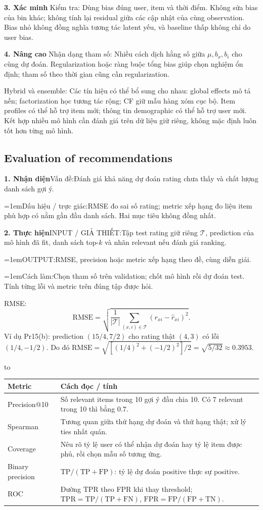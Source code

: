 \documentclass[10pt,a4paper,twocolumn]{article}
\newif\ifexamheadingprinted
\newcommand{\topic}[2]{%
  \global\examheadingprintedfalse\par\subsection{#2}\label{topic:#1}}
\newcommand{\key}[1]{#1:\enspace}
\newenvironment{examtable}[1]{%
  \par\addvspace{2pt}\noindent\hbox to \linewidth\bgroup\hfil
  \setlength{\tabcolsep}{4pt}%
  \renewcommand{\arraystretch}{1.12}\begin{tabular}{#1}%
}{\end{tabular}\hfil\egroup\par\addvspace{2pt}}
\newcommand{\algfield}[2]{\par\noindent\hangindent=1em\relax#1:\enspace#2}
\newcommand{\unitheading}[2]{%
  \par\addvspace{1pt}\noindent\textbf{#1. #2}\enspace}
\newcommand{\unitverification}{\unitheading{3}{Xác minh}}
\newcommand{\unitadvanced}{\unitheading{4}{Nâng cao}}
\newcommand{\unitfield}[4]{%
  \par\noindent\textbf{#1. #2}\enspace #3:\enspace #4}
\newcommand{\algsummary}[6]{%
  \begingroup\setlength{\parskip}{1pt}%
  \unitfield{1}{Nhận diện}{Vấn đề}{#1}%
  \algfield{Dấu hiệu / trực giác}{#2}%
  \if\relax\detokenize{#3}\relax\else\par\noindent#3\par\fi%
  \unitfield{2}{Thực hiện}{INPUT / GIẢ THIẾT}{#4}%
  \algfield{OUTPUT}{#5}%
  \algfield{Cách làm}{#6}\par\endgroup}
\begin{document}
\unitverification
\key{Kiểm tra} Dùng bias đúng user, item và thời điểm. Không sửa bias của bin khác; không tính lại residual giữa các cập nhật của cùng observation. Bias nhỏ không đồng nghĩa tương tác latent yếu, và baseline thấp không chỉ do user bias.

\unitadvanced
\key{Nhận dạng tham số} Nhiều cách dịch hằng số giữa $\mu,b_x,b_i$ cho cùng dự đoán. Regularization hoặc ràng buộc tổng bias giúp chọn nghiệm ổn định; tham số theo thời gian cũng cần regularization.

\key{Hybrid và ensemble} Các tín hiệu có thể bổ sung cho nhau: global effects mô tả nền; factorization học tương tác rộng; CF giữ mẫu hàng xóm cục bộ. Item profiles có thể hỗ trợ item mới; thông tin demographic có thể hỗ trợ user mới. Kết hợp nhiều mô hình cần đánh giá trên dữ liệu giữ riêng, không mặc định luôn tốt hơn từng mô hình.

\topic{recevaluation}{Evaluation of recommendations}

\algsummary{Đánh giá khả năng dự đoán rating chưa thấy và chất lượng danh sách gợi ý.}{RMSE đo sai số rating; metric xếp hạng đo liệu item phù hợp có nằm gần đầu danh sách. Hai mục tiêu không đồng nhất.}{}{Tập test rating giữ riêng $\mathcal T$, prediction của mô hình đã fit, danh sách top-$k$ và nhãn relevant nếu đánh giá ranking.}{RMSE, precision hoặc metric xếp hạng theo đề, cùng diễn giải.}{Chọn tham số trên validation; chốt mô hình rồi dự đoán test. Tính từng lỗi và metric trên đúng tập được hỏi.}

\key{RMSE}
\[
\mathrm{RMSE}
=\sqrt{\frac1{|\mathcal T|}\sum_{(x,i)\in\mathcal T}
(r_{xi}-\hat r_{xi})^2}.
\]
Ví dụ Pr15(b): prediction $(15/4,7/2)$ cho rating thật $(4,3)$ có lỗi $(1/4,-1/2)$. Do đó $\mathrm{RMSE}=\sqrt{[(1/4)^2+(-1/2)^2]/2}=\sqrt{5/32}\approx0.3953$.

\begin{examtable}{@{}p{}p{}@{}}
\toprule
Metric & Cách đọc / tính \\
\midrule
Precision@10 & Số relevant items trong 10 gợi ý đầu chia 10. Có 7 relevant trong 10 thì bằng $0.7$. \\
Spearman & Tương quan giữa thứ hạng dự đoán và thứ hạng thật; xử lý ties nhất quán. \\
Coverage & Nêu rõ tỷ lệ user có thể nhận dự đoán hay tỷ lệ item được phủ, rồi chọn mẫu số tương ứng. \\
Binary precision & $\mathrm{TP}/(\mathrm{TP}+\mathrm{FP})$: tỷ lệ dự đoán positive thực sự positive. \\
ROC & Đường TPR theo FPR khi thay threshold; $\mathrm{TPR}=\mathrm{TP}/(\mathrm{TP}+\mathrm{FN})$, $\mathrm{FPR}=\mathrm{FP}/(\mathrm{FP}+\mathrm{TN})$. \\
\bottomrule
\end{examtable}
\end{document}
